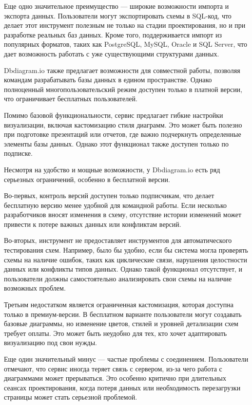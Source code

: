 Еще одно значительное преимущество — широкие возможности импорта и экспорта данных. Пользователи могут экспортировать схемы в SQL-код, что делает этот инструмент полезным не только на стадии проектирования, но и при разработке реальных баз данных. Кроме того, поддерживается импорт из популярных форматов, таких как PostgreSQL, MySQL, Oracle и SQL Server, что дает возможность работать с уже существующими структурами данных.

Dbdiagram.io также предлагает возможности для совместной работы, позволяя командам разрабатывать базы данных в едином пространстве. Однако полноценный многопользовательский режим доступен только в платной версии, что ограничивает бесплатных пользователей.

Помимо базовой функциональности, сервис предлагает гибкие настройки визуализации, включая кастомизацию стиля диаграмм. Это может быть полезно при подготовке презентаций или отчетов, где важно подчеркнуть определенные элементы базы данных. Однако этот функционал также доступен только по подписке.

Несмотря на удобство и мощные возможности, у Dbdiagram.io есть ряд серьезных ограничений, особенно в бесплатной версии.

Во-первых, контроль версий доступен только подписчикам, что делает бесплатную версию менее удобной для командной работы. Если несколько разработчиков вносят изменения в схему, отсутствие истории изменений может привести к потере важных данных или конфликтам версий.

Во-вторых, инструмент не предоставляет инструментов для автоматического тестирования схем. Например, было бы удобно, если бы система могла проверять схемы на наличие ошибок, таких как циклические связи, нарушения целостности данных или конфликты типов данных. Однако такой функционал отсутствует, и пользователи должны самостоятельно анализировать свои схемы на наличие возможных проблем.

Третьим недостатком является ограниченная кастомизация, которая доступна только в премиум-версии. В бесплатном варианте пользователи могут создавать базовые диаграммы, но изменение цветов, стилей и уровней детализации схем требует оплаты. Это может быть неудобно для тех, кто хочет адаптировать визуализацию под свои нужды.

Еще один значительный минус — частые проблемы с соединением. Пользователи отмечают, что сервис иногда теряет связь с сервером, из-за чего работа с диаграммами может прерываться. Это особенно критично при длительных сеансах проектирования, когда потеря данных или необходимость перезагрузки страницы может стать серьезной проблемой.

